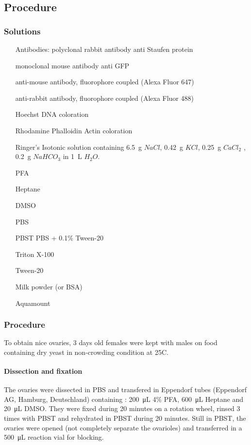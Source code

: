\documentclass{article}
\begin{document}
\newpage
\subsection*{Procedure}
\subsubsection*{Solutions}

\begin{enumerate}[leftmargin=4.5cm]
	\item [Antibodies: ] polyclonal rabbit antibody anti Staufen protein
	\item [] monoclonal mouse antibody anti GFP
	\item [] anti-mouse antibody, fluorophore coupled (Alexa Fluor 647)
	\item [] anti-rabbit antibody, fluorophore coupled (Alexa Fluor 488)
	\item [Hoechst] DNA coloration 
	\item [Rhodamine Phalloidin] Actin coloration
	\item [Ringer's] Isotonic solution containing \SI{6.5}{\gram} $NaCl$, \SI{0.42}{\gram} $KCl$, \SI{0.25}{\gram} $CaCl_2$ , \SI{0.2}{\gram} $NaHCO_3 $ in \SI{1}{\liter} $H_2O$. 
	\item [PFA]
	\item [Heptane]
	\item [DMSO]
	\item [PBS]
	\item [PBST]  PBS + 0.1\% Tween-20
	\item [Triton X-100]
	\item [Tween-20]
	\item [Milk powder (or BSA)]
	\item [Aquamount]
\end{enumerate}

\subsubsection*{Procedure}
To obtain nice ovaries, 3 days old females were kept with males on food containing dry yeast in non-crowding condition at 25\degree C. \\

\paragraph{Dissection and fixation}The ovaries were dissected in PBS and transfered in Eppendorf tubes (Eppendorf AG, Hamburg, Deutschland) containing : \SI{200}{\micro\liter} 4\%  PFA, \SI{600}{\micro\liter} Heptane and \SI{20}{\micro\liter}  DMSO. They were fixed during 20 minutes on a rotation wheel, rinsed 3 times with PBST and rehydrated in PBST during 20 minutes. Still in PBST, the ovaries were opened (not completely separate the ovarioles) and transferred in a \SI{500}{\micro\liter} reaction vial for blocking. 
\end{document}

